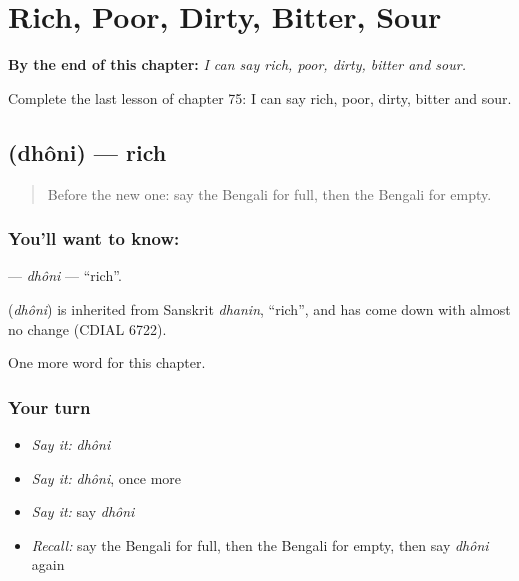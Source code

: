 
\chapter{Rich, Poor, Dirty, Bitter, Sour}
\label{ch:bn-rich-poor-dirty-bitter-sour}

\begin{chapteropening}
\textbf{By the end of this chapter:} \emph{I can say rich, poor, dirty, bitter and sour.}

Complete the last lesson of chapter 75: I can say rich, poor, dirty, bitter and sour.
\end{chapteropening}

\section[\texorpdfstring{\bn{ধনী} (dhôni)}{ধনী (dhôni)}]{ (dhôni) — rich}

\label{lesson:BN-C75-dhoni}



\begin{quote}
Before the new one: say the Bengali for full, then the Bengali for empty.
\end{quote}

\subsection*{You'll want to know: }
\textbf{} — \emph{dhôni} — \textquotedblleft{}rich\textquotedblright{}.

\begin{cousinweb}
\textbf{} (\emph{dhôni}) is inherited from Sanskrit \emph{dhanin}, \textquotedblleft{}rich\textquotedblright{}, and has come down with almost no change (CDIAL 6722).
\end{cousinweb}

\begin{grammarlens}[title={What you've built}]
One more word for this chapter.
\end{grammarlens}

\subsection*{Your turn}
\begin{itemize}
\raggedright
  \item \emph{Say it:} \emph{dhôni}
  \item \emph{Say it:} \emph{dhôni}, once more
  \item \emph{Say it:} say \emph{dhôni}
  \item \emph{Recall:} say the Bengali for full, then the Bengali for empty, then say \emph{dhôni} again
\end{itemize}

